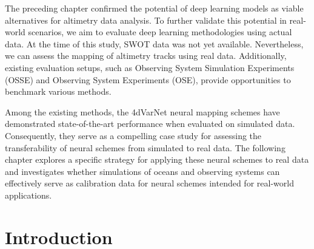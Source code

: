 \begin{bibunit}[IEEEtran.bst]

The preceding chapter confirmed the potential of deep learning models as viable alternatives for altimetry data analysis. To further validate this potential in real-world scenarios, we aim to evaluate deep learning methodologies using actual data. At the time of this study, SWOT data was not yet available. Nevertheless, we can assess the mapping of altimetry tracks using real data. Additionally, existing evaluation setups, such as Observing System Simulation Experiments (OSSE) and Observing System Experiments (OSE), provide opportunities to benchmark various methods.

Among the existing methods, the 4dVarNet neural mapping schemes have demonstrated state-of-the-art performance when evaluated on simulated data. Consequently, they serve as a compelling case study for assessing the transferability of neural schemes from simulated to real data. The following chapter explores a specific strategy for applying these neural schemes to real data and investigates whether simulations of oceans and observing systems can effectively serve as calibration data for neural schemes intended for real-world applications.
\section{Introduction}




\end{bibunit}
